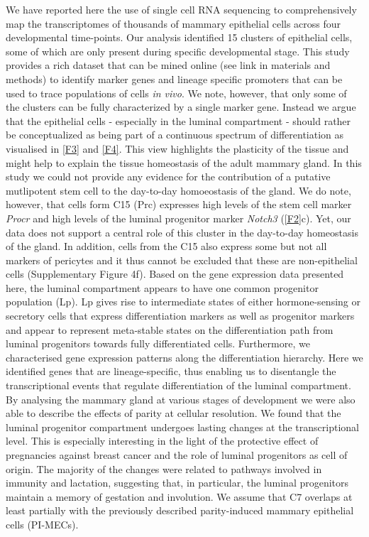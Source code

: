 \documentclass[titlepage, 12pt, oneside]{amsart}
\begin{document}
We have reported here the use of single cell RNA sequencing to comprehensively map the transcriptomes of thousands of mammary epithelial cells across four developmental time-points.
Our analysis identified 15 clusters of epithelial cells, some of which are only present during specific developmental stage.
This study provides a rich dataset that can be mined online (see link in materials and methods) to identify marker genes and lineage specific promoters that can be used to trace populations of cells \textit{in vivo}.
We note, however, that only some of the clusters can be fully characterized by a single marker gene.
Instead we argue that the epithelial cells - especially in the luminal compartment - should rather be conceptualized as being part of a continuous spectrum of differentiation as visualised in \autoref{F3} and \autoref{F4}.
This view highlights the plasticity of the tissue and might help to explain the tissue homeostasis of the adult mammary gland\autocite{Inman2015}.
In this study we could not provide any evidence for the contribution of a putative mutlipotent stem cell to the day-to-day homoeostasis of the gland.
We do note, however, that cells form C15 (Prc) expresses high levels of the stem cell marker \textit{Procr}\autocite{Wang2015} and high levels of the luminal progenitor marker \textit{Notch3}\autocite{Lafkas2013} (\autoref{F2}c).
Yet, our data does not support a central role of this cluster in the day-to-day homeostasis of the gland. 
In addition, cells from the C15 also express some but not all markers of pericytes and it thus cannot be excluded that these are non-epithelial cells (Supplementary Figure 4f). 
Based on the gene expression data presented here, the luminal compartment appears to have one common progenitor population (Lp).
Lp gives rise to intermediate states of either hormone-sensing or secretory cells that express differentiation markers as well as progenitor markers and appear to represent meta-stable states on the differentiation path from luminal progenitors towards fully differentiated cells.
Furthermore, we characterised gene expression patterns along the differentiation hierarchy.
Here we identified genes that are lineage-specific, thus enabling us to disentangle the transcriptional events that regulate differentiation of the luminal compartment.
By analysing the mammary gland at various stages of development we were also able to describe the effects of parity at cellular resolution.
We found that the luminal progenitor compartment undergoes lasting changes at the transcriptional level.
This is especially interesting in the light of the protective effect of pregnancies against breast cancer and the role of luminal progenitors as cell of origin.
The majority of the changes were related to pathways involved in immunity and lactation, suggesting that, in particular, the luminal progenitors maintain a memory of gestation and involution.
We assume that C7 overlaps at least partially with the previously described parity-induced mammary epithelial cells (PI-MECs)\autocite{Wagner2002}.
\end{document}
